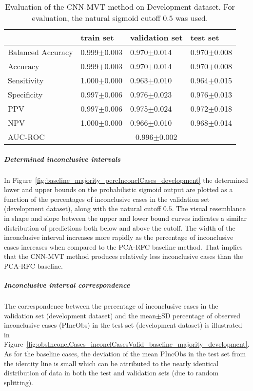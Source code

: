 \begin{table}[ht]
  \caption{Evaluation of the CNN-MVT method on Development dataset. 
  For evaluation, the natural sigmoid cutoff $0.5$ was used.}
  \centering
  \begin{tabular}{llll}
      \hline
                        & train set         & validation set      & test set             \\
      \hline
      Balanced Accuracy & 0.999$\pm$0.003   &  0.970$\pm$0.014    &  0.970$\pm$0.008   \\
      Accuracy          & 0.999$\pm$0.003    &   0.970$\pm$0.014   &  0.970$\pm$0.008   \\
      Sensitivity       &  1.000$\pm$0.000   &   0.963$\pm$0.010   &  0.964$\pm$0.015  \\
      Specificity       &   0.997$\pm$0.006   &   0.976$\pm$0.023  &   0.976$\pm$0.013  \\
      PPV               &  0.997$\pm$0.006   &   0.975$\pm$0.024   &  0.972$\pm$0.018 \\
      NPV               &  1.000$\pm$0.000    &   0.966$\pm$0.010   & 0.968$\pm$0.014  \\
      \hline
      AUC-ROC          &  \multicolumn{3}{c}{0.996$\pm$0.002}  \\
      \hline
  \end{tabular}
 \label{t1:cnn_mvt_perf_eval_table}
\end{table}

\subparagraph{Determined inconclusive intervals}

In Figure~\ref{fig:baseline_majority_percInconclCases_development} the determined lower and upper bounds on the 
probabilistic sigmoid output are plotted as a function of the percentages of inconclusive cases 
in the validation set (development dataset), along with the natural cutoff $0.5$.
The visual resemblance in shape and slope between the upper and lower bound curves 
indicates a similar distribution of predictions both below and above the cutoff.
The width of the inconclusive interval increases more rapidly as the percentage of inconclusive cases increases 
when compared to the PCA-RFC baseline method.
That implies that the CNN-MVT method produces relatively less inconclusive cases than the PCA-RFC baseline.


\subparagraph{Inconclusive interval correspondence}

The correspondence between the percentage of inconclusive cases in the validation set (development dataset) and 
the mean$\pm$SD percentage of observed inconclusive cases (PIncObs) in the test set (development dataset) 
is illustrated in Figure~\ref{fig:obsInconclCases_inconclCasesValid_baseline_majority_development}.
As for the baseline cases, the deviation of the mean PIncObs in the test set from the 
identity line is small which can be attributed to the nearly identical distribution of data in both the test and validation sets 
(due to random splitting).


